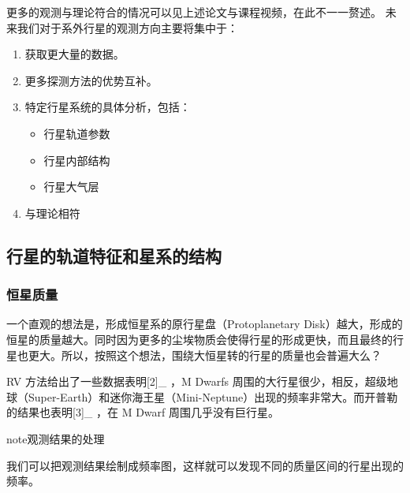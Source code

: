 \documentclass[letterpaper,10pt,english]{sphinxmanual}
\begin{document}
更多的观测与理论符合的情况可以见上述论文与课程视频，在此不一一赘述。
未来我们对于系外行星的观测方向主要将集中于：
\begin{enumerate}
\item {} 
获取更大量的数据。

\item {} 
更多探测方法的优势互补。

\item {} 
特定行星系统的具体分析，包括：
\begin{itemize}
\item {} 
行星轨道参数

\item {} 
行星内部结构

\item {} 
行星大气层

\end{itemize}

\item {} 
与理论相符

\end{enumerate}


\subsection{行星的轨道特征和星系的结构}
\label{statistics:id12}

\subsubsection{恒星质量}
\label{statistics:id13}
一个直观的想法是，形成恒星系的原行星盘（Protoplanetary Disk）越大，形成的恒星的质量越大。同时因为更多的尘埃物质会使得行星的形成更快，而且最终的行星也更大。所以，按照这个想法，围绕大恒星转的行星的质量也会普遍大么？

RV 方法给出了一些数据表明{[}2{]}\_ ，M Dwarfs 周围的大行星很少，相反，超级地球（Super-Earth）和迷你海王星（Mini-Neptune）出现的频率非常大。而开普勒的结果也表明{[}3{]}\_ ，在 M Dwarf 周围几乎没有巨行星。

\begin{notice}{note}{观测结果的处理}

我们可以把观测结果绘制成频率图，这样就可以发现不同的质量区间的行星出现的频率。
\end{notice}
\end{document}

